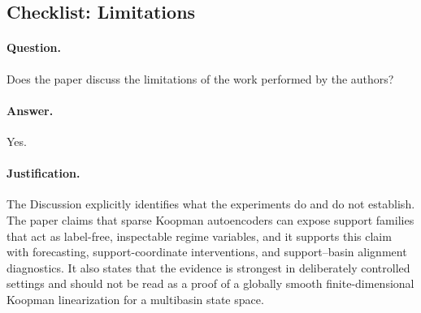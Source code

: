 \subsection{Checklist: Limitations}
\label{app:checklist_limitations}

\paragraph{Question.}
Does the paper discuss the limitations of the work performed by the authors?

\paragraph{Answer.}
Yes.

\paragraph{Justification.}
The Discussion explicitly identifies what the experiments do and do not establish.
The paper claims that sparse Koopman autoencoders can expose support families that
act as label-free, inspectable regime variables, and it supports this claim with
forecasting, support-coordinate interventions, and support--basin alignment
diagnostics.  It also states that the evidence is strongest in deliberately
controlled settings and should not be read as a proof of a globally smooth
finite-dimensional Koopman linearization for a multibasin state space.

